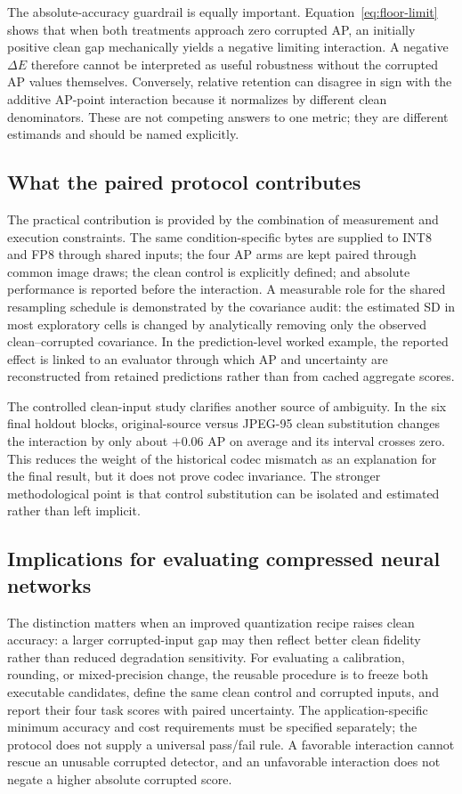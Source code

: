 \documentclass[a4paper,fleqn]{cas-dc}
\begin{document}
The absolute-accuracy guardrail is equally important. Equation~\eqref{eq:floor-limit} shows that when both treatments approach zero corrupted AP, an initially positive clean gap mechanically yields a negative limiting interaction. A negative $\Delta E$ therefore cannot be interpreted as useful robustness without the corrupted AP values themselves. Conversely, relative retention can disagree in sign with the additive AP-point interaction because it normalizes by different clean denominators. These are not competing answers to one metric; they are different estimands and should be named explicitly.

\subsection{What the paired protocol contributes}

The practical contribution is provided by the combination of measurement and execution constraints. The same condition-specific bytes are supplied to INT8 and FP8 through shared inputs; the four AP arms are kept paired through common image draws; the clean control is explicitly defined; and absolute performance is reported before the interaction. A measurable role for the shared resampling schedule is demonstrated by the covariance audit: the estimated SD in most exploratory cells is changed by analytically removing only the observed clean--corrupted covariance. In the prediction-level worked example, the reported effect is linked to an evaluator through which AP and uncertainty are reconstructed from retained predictions rather than from cached aggregate scores.

The controlled clean-input study clarifies another source of ambiguity. In the six final holdout blocks, original-source versus JPEG-95 clean substitution changes the interaction by only about $+0.06$ AP on average and its interval crosses zero. This reduces the weight of the historical codec mismatch as an explanation for the final result, but it does not prove codec invariance. The stronger methodological point is that control substitution can be isolated and estimated rather than left implicit.

\subsection{Implications for evaluating compressed neural networks}

The distinction matters when an improved quantization recipe raises clean accuracy: a larger corrupted-input gap may then reflect better clean fidelity rather than reduced degradation sensitivity. For evaluating a calibration, rounding, or mixed-precision change, the reusable procedure is to freeze both executable candidates, define the same clean control and corrupted inputs, and report their four task scores with paired uncertainty. The application-specific minimum accuracy and cost requirements must be specified separately; the protocol does not supply a universal pass/fail rule. A favorable interaction cannot rescue an unusable corrupted detector, and an unfavorable interaction does not negate a higher absolute corrupted score.
\end{document}
